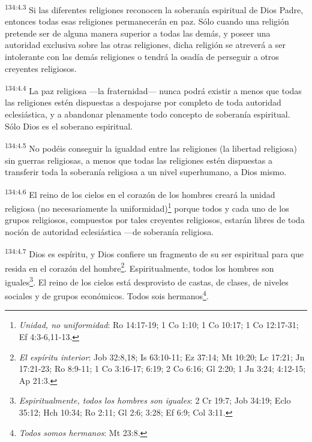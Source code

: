 \par
\textsuperscript{134:4.3} Si las diferentes religiones reconocen la soberanía espiritual de Dios Padre, entonces todas esas religiones permanecerán en paz. Sólo cuando una religión pretende ser de alguna manera superior a todas las demás, y poseer una autoridad exclusiva sobre las otras religiones, dicha religión se atreverá a ser intolerante con las demás religiones o tendrá la osadía de perseguir a otros creyentes religiosos.

\par
\textsuperscript{134:4.4} La paz religiosa ---la fraternidad--- nunca podrá existir a menos que todas las religiones estén dispuestas a despojarse por completo de toda autoridad eclesiástica, y a abandonar plenamente todo concepto de soberanía espiritual. Sólo Dios es el soberano espiritual.

\par
\textsuperscript{134:4.5} No podéis conseguir la igualdad entre las religiones (la libertad religiosa) sin guerras religiosas, a menos que todas las religiones estén dispuestas a transferir toda la soberanía religiosa a un nivel superhumano, a Dios mismo.

\par
\textsuperscript{134:4.6} El reino de los cielos en el corazón de los hombres creará la unidad religiosa (no necesariamente la uniformidad)\footnote{\textit{Unidad, no uniformidad}: Ro 14:17-19; 1 Co 1:10; 1 Co 10:17; 1 Co 12:17-31; Ef 4:3-6,11-13.} porque todos y cada uno de los grupos religiosos, compuestos por tales creyentes religiosos, estarán libres de toda noción de autoridad eclesiástica ---de soberanía religiosa.

\par
\textsuperscript{134:4.7} Dios es espíritu, y Dios confiere un fragmento de su ser espiritual para que resida en el corazón del hombre\footnote{\textit{El espíritu interior}: Job 32:8,18; Is 63:10-11; Ez 37:14; Mt 10:20; Lc 17:21; Jn 17:21-23; Ro 8:9-11; 1 Co 3:16-17; 6:19; 2 Co 6:16; Gl 2:20; 1 Jn 3:24; 4:12-15; Ap 21:3.}. Espiritualmente, todos los hombres son iguales\footnote{\textit{Espiritualmente, todos los hombres son iguales}: 2 Cr 19:7; Job 34:19; Eclo 35:12; Hch 10:34; Ro 2:11; Gl 2:6; 3:28; Ef 6:9; Col 3:11.}. El reino de los cielos está desprovisto de castas, de clases, de niveles sociales y de grupos económicos. Todos sois hermanos\footnote{\textit{Todos somos hermanos}: Mt 23:8.}.

